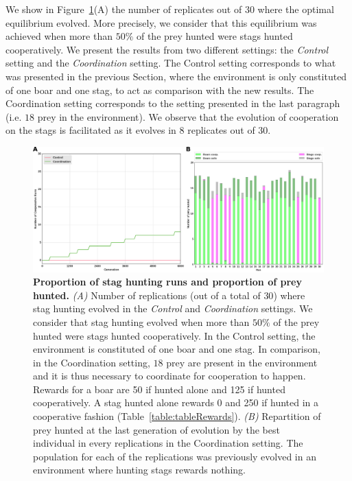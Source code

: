     We show in Figure~\ref{fig:figRecycling}(A) the number of replicates out of $30$ where the optimal equilibrium evolved. More precisely, we consider that this equilibrium was achieved when more than \(50\%\) of the prey hunted were stags hunted cooperatively. We present the results from two different settings: the \emph{Control} setting and the \emph{Coordination} setting. The Control setting corresponds to what was presented in the previous Section, where the environment is only constituted of one boar and one stag, to act as comparison with the new results. The Coordination setting corresponds to the setting presented in the last paragraph (i.e. $18$ prey in the environment). We observe that the evolution of cooperation on the stags is facilitated as it evolves in $8$ replicates out of $30$. 

    \begin{figure}[h]
      \centering
        \includegraphics[width=1\linewidth]{fig/ArticleBio2/Fig2.png}
        \caption{\textbf{Proportion of stag hunting runs and proportion of prey hunted.}
        \emph{(A)} Number of replications (out of a total of $30$) where stag hunting evolved in the \emph{Control} and \emph{Coordination} settings. We consider that stag hunting evolved when more than $50\%$ of the prey hunted were stags hunted cooperatively. In the Control setting, the environment is constituted of one boar and one stag. In comparison, in the Coordination setting, $18$ prey are present in the environment and it is thus necessary to coordinate for cooperation to happen. Rewards for a boar are 50 if hunted alone and 125 if hunted cooperatively. A stag hunted alone rewards 0 and 250 if hunted in a cooperative fashion (Table~\ref{table:tableRewards}). \emph{(B)} Repartition of prey hunted at the last generation of evolution by the best individual in every replications in the Coordination setting. The population for each of the replications was previously evolved in an environment where hunting stags rewards nothing.}
      \label{fig:figRecycling}
    \end{figure}

